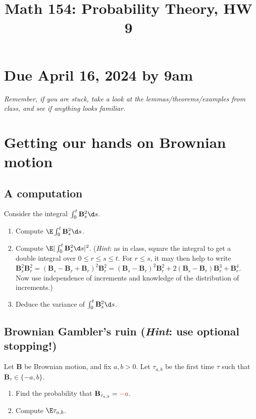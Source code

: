 \documentclass[12pt,reqno]{amsart}
\title{\Large Math 154: Probability Theory, HW 9\vspace{-0.1cm}}
\theoremstyle{definition}
\theoremstyle{remark}
\numberwithin{equation}{section}
\newenvironment{nouppercase}{%
  \let\uppercase\relax%
  \renewcommand{\uppercasenonmath}[1]{}}{}
\begin{document}
\begin{nouppercase}
\maketitle
\end{nouppercase}
\section*{Due April 16, 2024 by 9am}
\emph{Remember, if you are stuck, take a look at the lemmas/theorems/examples from class, and see if anything looks familiar.}
\section{Getting our hands on Brownian motion}
\subsection{A computation}
Consider the integral $\int_{0}^{t}\mathbf{B}_{s}^{2}\d s$.
\begin{enumerate}
\item Compute $\E\int_{0}^{t}\mathbf{B}_{s}^{2}\d s$.
\item Compute $\E|\int_{0}^{t}\mathbf{B}_{s}^{2}\d s|^{2}$. (\emph{Hint}: as in class, square the integral to get a double integral over $0\leq r\leq s\leq t$. For $r\leq s$, it may then help to write $\mathbf{B}_{s}^{2}\mathbf{B}_{r}^{2}=(\mathbf{B}_{s}-\mathbf{B}_{r}+\mathbf{B}_{r})^{2}\mathbf{B}_{r}^{2}=(\mathbf{B}_{s}-\mathbf{B}_{r})^{2}\mathbf{B}_{r}^{2}+2(\mathbf{B}_{s}-\mathbf{B}_{r})\mathbf{B}_{r}^{3}+\mathbf{B}_{r}^{4}$. Now use independence of increments and knowledge of the distribution of increments.)
\item Deduce the variance of $\int_{0}^{t}\mathbf{B}_{s}^{2}\d s$.
\end{enumerate}
\subsection{Brownian Gambler's ruin (\emph{Hint}: use optional stopping!)}
Let $\mathbf{B}$ be Brownian motion, and fix $a,b>0$. Let $\tau_{a,b}$ be the first time $\tau$ such that $\mathbf{B}_{\tau}\in\{-a,b\}$.
\begin{enumerate}
\item Find the probability that $\mathbf{B}_{\tau_{a,b}}={\color{red}-a}$.
\item Compute $\E\tau_{a,b}$.
\end{enumerate}
\end{document}
